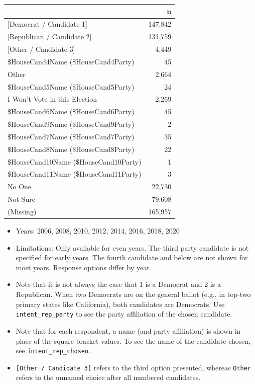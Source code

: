 \documentclass[10pt,article,oneside]{memoir}
\theoremstyle{definition}
\begin{document}
\begin{table}[H]
\centering
\begin{tabular}[t]{lr}
\toprule
 & n\\
\midrule
{}{[Democrat / Candidate 1]} & 147,842\\
{}{[Republican / Candidate 2]} & 131,759\\
{}{[Other / Candidate 3]} & 4,449\\
\$HouseCand4Name (\$HouseCand4Party) & 45\\
Other & 2,664\\
\$HouseCand5Name (\$HouseCand5Party) & 24\\
I Won't Vote in this Election & 2,269\\
\$HouseCand6Name (\$HouseCand6Party) & 45\\
\$HouseCand9Name (\$HouseCand9Party) & 2\\
\$HouseCand7Name (\$HouseCand7Party) & 35\\
\$HouseCand8Name (\$HouseCand8Party) & 22\\
\$HouseCand10Name (\$HouseCand10Party) & 1\\
\$HouseCand11Name (\$HouseCand11Party) & 3\\
No One & 22,730\\
Not Sure & 79,608\\
(Missing) & 165,957\\
\bottomrule
\end{tabular}
\end{table}

\begin{itemize}
\tightlist
\item
  Years: 2006, 2008, 2010, 2012, 2014, 2016, 2018, 2020
\item
  Limitations: Only available for even years. The third party candidate
  is not specified for early years. The fourth candidate and below are
  not shown for most years. Response options differ by year.
\item
  Note that it is not always the case that 1 is a Democrat and 2 is a
  Republican. When two Democrats are on the general ballot (e.g., in
  top-two primary states like California), both candidates are
  Democrats. Use \texttt{intent\_rep\_party} to see the party
  affiliation of the chosen candidate.
\item
  Note that for each respondent, a name (and party affiliation) is shown
  in place of the square bracket values. To see the name of the
  candidate chosen, see \texttt{intent\_rep\_chosen}.
\item
  \texttt{{[}Other\ /\ Candidate\ 3{]}} refers to the third option
  presented, whereas \texttt{Other} refers to the unnamed choice after
  all numbered candidates.
\end{itemize}
\end{document}

